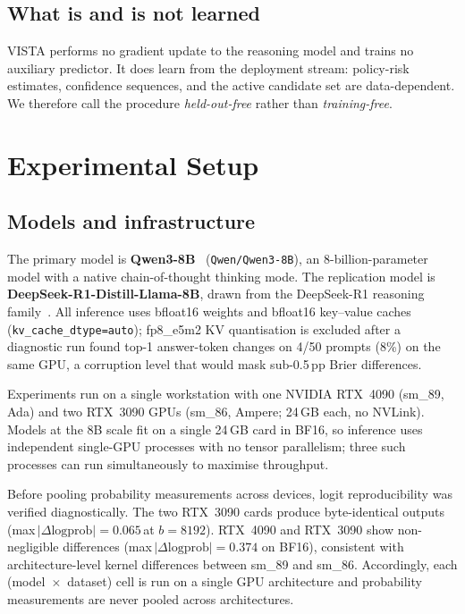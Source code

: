 \documentclass[a4paper,fleqn]{cas-sc}
\theoremstyle{plain}
\theoremstyle{definition}
\theoremstyle{remark}
\begin{document}
\subsection{What is and is not learned}

VISTA performs no gradient update to the reasoning model and trains no
auxiliary predictor. It does learn from the deployment stream: policy-risk
estimates, confidence sequences, and the active candidate set are
data-dependent. We therefore call the procedure \emph{held-out-free} rather
than \emph{training-free}.

\section{Experimental Setup}
\label{sec:experiments}

\subsection{Models and infrastructure}

The primary model is \textbf{Qwen3-8B}~\cite{qwen3} (\texttt{Qwen/Qwen3-8B}), an
8-billion-parameter model with a native chain-of-thought thinking mode.
The replication model is \textbf{DeepSeek-R1-Distill-Llama-8B}, drawn from
the DeepSeek-R1 reasoning family~\cite{deepseekr1}.
All inference uses bfloat16 weights and bfloat16 key--value caches
(\texttt{kv\_cache\_dtype=auto}); fp8\_e5m2 KV quantisation is excluded
after a diagnostic run found top-1 answer-token changes on 4/50 prompts
(8\%) on the same GPU, a corruption level that would mask sub-0.5\,pp Brier
differences.

Experiments run on a single workstation with one NVIDIA RTX~4090 (sm\_89,
Ada) and two RTX~3090 GPUs (sm\_86, Ampere; 24\,GB each, no NVLink).
Models at the 8B scale fit on a single 24\,GB card in BF16, so inference
uses independent single-GPU processes with no tensor parallelism; three
such processes can run simultaneously to maximise throughput.

Before pooling probability measurements across devices, logit reproducibility
was verified diagnostically. The two RTX~3090 cards produce byte-identical
outputs (max\,$|\Delta\text{logprob}|=0.065$\,at $b=8192$). RTX~4090 and
RTX~3090 show non-negligible differences (max\,$|\Delta\text{logprob}|=0.374$
on BF16), consistent with architecture-level kernel differences between
sm\_89 and sm\_86. Accordingly, each (model~$\times$~dataset) cell is
run on a single GPU architecture and probability measurements are
never pooled across architectures.
\end{document}
